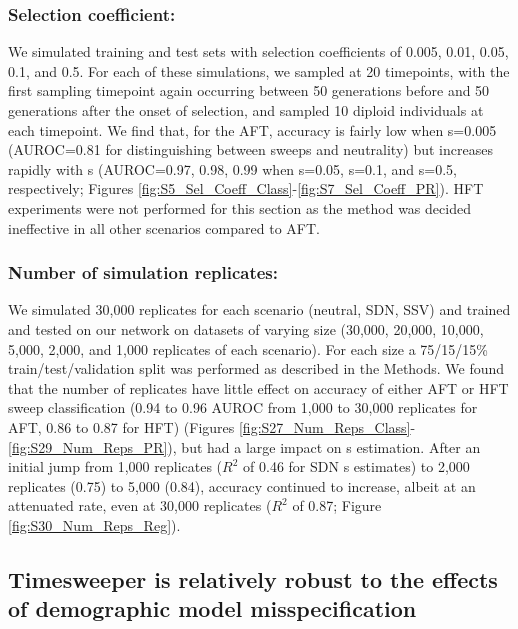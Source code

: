 \subsubsection{Selection coefficient:} We simulated training and test sets with selection coefficients of 0.005, 0.01, 0.05, 0.1, and 0.5. For each of these simulations, we sampled at 20 timepoints, with the first sampling timepoint again occurring between 50 generations before and 50 generations after the onset of selection, and sampled 10 diploid individuals at each timepoint. We find that, for the AFT, accuracy is fairly low when s=0.005 (AUROC=0.81 for distinguishing between sweeps and neutrality) but increases rapidly with s (AUROC=0.97, 0.98, 0.99 when s=0.05, s=0.1, and s=0.5, respectively; Figures \ref{fig:S5_Sel_Coeff_Class}-\ref{fig:S7_Sel_Coeff_PR}). HFT experiments were not performed for this section as the method was decided ineffective in all other scenarios compared to AFT.  \\

\subsubsection{Number of simulation replicates:} We simulated 30,000 replicates for each scenario (neutral, SDN, SSV) and trained and tested on our network on datasets of varying size (30,000, 20,000, 10,000, 5,000, 2,000, and 1,000 replicates of each scenario). For each size a 75/15/15\% train/test/validation split was performed as described in the Methods. We found that the number of replicates have little effect on accuracy of either AFT or HFT sweep classification (0.94 to 0.96 AUROC from 1,000 to 30,000 replicates for AFT, 0.86 to 0.87 for HFT) (Figures \ref{fig:S27_Num_Reps_Class}-\ref{fig:S29_Num_Reps_PR}), but had a large impact on s estimation. After an initial jump from 1,000 replicates ($R^2$ of 0.46 for SDN s estimates) to 2,000 replicates (0.75) to 5,000 (0.84), accuracy continued to increase, albeit at an attenuated rate, even at 30,000 replicates ($R^2$ of 0.87; Figure \ref{fig:S30_Num_Reps_Reg}). \\

\subsection{Timesweeper is relatively robust to the effects of demographic model misspecification}

